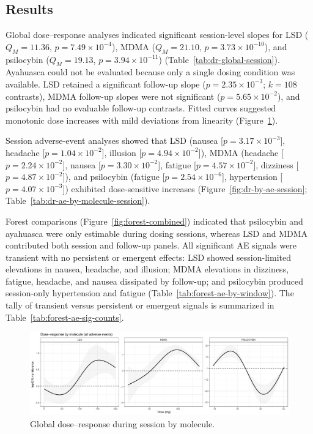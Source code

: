 \subsection{Results}

Global dose--response analyses indicated significant session-level slopes for LSD ($Q_M = 11.36$, $p = 7.49\times10^{-4}$), MDMA ($Q_M = 21.10$, $p = 3.73\times10^{-10}$), and psilocybin ($Q_M = 19.13$, $p = 3.94\times10^{-11}$) (Table~\ref{tab:dr-global-session}). Ayahuasca could not be evaluated because only a single dosing condition was available. LSD retained a significant follow-up slope ($p = 2.35\times10^{-3}$; $k = 108$ contrasts), MDMA follow-up slopes were not significant ($p = 5.65\times10^{-2}$), and psilocybin had no evaluable follow-up contrasts. Fitted curves suggested monotonic dose increases with mild deviations from linearity (Figure~\ref{fig:dr-global-session}).

Session adverse-event analyses showed that LSD (nausea [$p = 3.17\times10^{-3}$], headache [$p = 1.04\times10^{-2}$], illusion [$p = 4.94\times10^{-2}$]), MDMA (headache [$p = 2.24\times10^{-2}$], nausea [$p = 3.30\times10^{-2}$], fatigue [$p = 4.57\times10^{-2}$], dizziness [$p = 4.87\times10^{-2}$]), and psilocybin (fatigue [$p = 2.54\times10^{-6}$], hypertension [$p = 4.07\times10^{-3}$]) exhibited dose-sensitive increases (Figure~\ref{fig:dr-by-ae-session}; Table~\ref{tab:dr-ae-by-molecule-session}).

Forest comparisons (Figure~\ref{fig:forest-combined}) indicated that psilocybin and ayahuasca were only estimable during dosing sessions, whereas LSD and MDMA contributed both session and follow-up panels. All significant AE signals were transient with no persistent or emergent effects: LSD showed session-limited elevations in nausea, headache, and illusion; MDMA elevations in dizziness, fatigue, headache, and nausea dissipated by follow-up; and psilocybin produced session-only hypertension and fatigue (Table~\ref{tab:forest-ae-by-window}). The tally of transient versus persistent or emergent signals is summarized in Table~\ref{tab:forest-ae-sig-counts}.

\begin{figure}[htb]
  \centering
  \includegraphics[width=\textwidth]{figures/master_dr_by_molecule-session.pdf}
  \caption{Global dose--response during session by molecule.}
  \label{fig:dr-global-session}
\end{figure}

